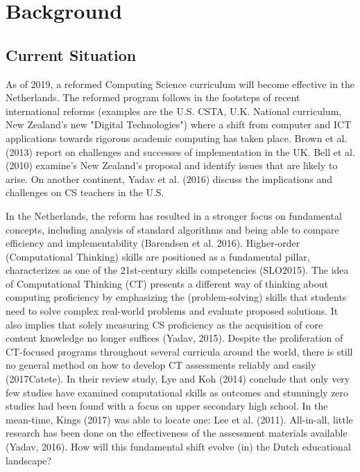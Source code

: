 
\section{Background}\label{sec:background}

\subsection{Current Situation}


As of 2019, a reformed Computing Science curriculum will become effective in the Netherlands. The reformed program follows in the footsteps of recent international reforms (examples are the U.S. CSTA, U.K. National curriculum, New Zealand's new "Digital Technologies") where a shift from computer and ICT applications towards rigorous academic computing has taken place. Brown et al. (2013) report on challenges and successes of implementation in the UK. Bell et al. (2010) examine's New Zealand's proposal and identify issues that are likely to arise. On another continent, Yadav et al. (2016) discuss the implications and challenges on CS teachers in the U.S.

In the Netherlands, the reform has resulted in a stronger focus on fundamental concepts, including analysis of standard algorithms and being able to compare efficiency and implementability (Barendsen et al. 2016). Higher-order (Computational Thinking) skills are positioned as a fundamental pillar, characterizes as one of the 21st-century skills competencies (SLO2015). The idea of Computational Thinking (CT) presents a different way of thinking about computing proficiency by emphasizing the (problem-solving) skills that students need to solve complex real-world problems and evaluate proposed solutions. It also implies that solely measuring CS proficiency as the acquisition of core content knowledge no longer suffices (Yadav, 2015). Despite the proliferation of CT-focused programs throughout several curricula around the world, there is still no general method on how to develop CT assessments reliably and easily (2017Catete). In their review study, Lye and Koh (2014) conclude that only very few studies have examined computational skills as outcomes and stunningly zero studies had been found with a focus on upper secondary high school. In the mean-time, Kings (2017) was able to locate one: Lee et al. (2011). All-in-all, little research has been done on the effectiveness of the assessment materials available (Yadav, 2016).
How will this fundamental shift evolve (in) the Dutch educational landscape?




